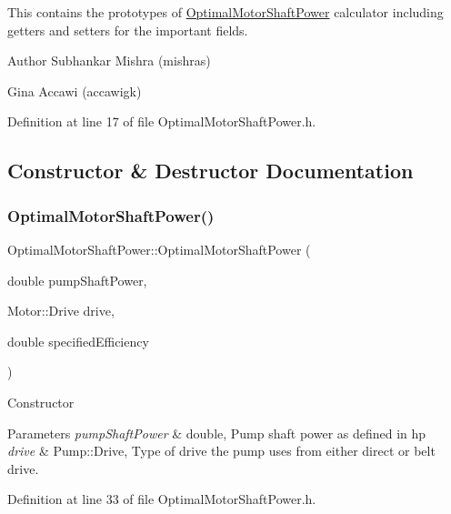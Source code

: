 This contains the prototypes of \hyperlink{class_optimal_motor_shaft_power}{Optimal\+Motor\+Shaft\+Power} calculator including getters and setters for the important fields.

\begin{DoxyAuthor}{Author}
Subhankar Mishra (mishras) 

Gina Accawi (accawigk) 
\end{DoxyAuthor}


Definition at line 17 of file Optimal\+Motor\+Shaft\+Power.\+h.



\subsection{Constructor \& Destructor Documentation}
\mbox{\label{class_optimal_motor_shaft_power_ad830e1f8a7931e3c6bec5f8828d57e83}} 
\subsubsection{\texorpdfstring{Optimal\+Motor\+Shaft\+Power()}{OptimalMotorShaftPower()}}
{\footnotesize\ttfamily Optimal\+Motor\+Shaft\+Power\+::\+Optimal\+Motor\+Shaft\+Power (\begin{DoxyParamCaption}\item[{double}]{pump\+Shaft\+Power,  }\item[{Motor\+::\+Drive}]{drive,  }\item[{double}]{specified\+Efficiency }\end{DoxyParamCaption})\hspace{0.3cm}{\ttfamily [inline]}}

Constructor 
\begin{DoxyParams}{Parameters}
{\em pump\+Shaft\+Power} & double, Pump shaft power as defined in hp \\
\hline
{\em drive} & Pump\+::\+Drive, Type of drive the pump uses from either direct or belt drive. \\
\hline
\end{DoxyParams}


Definition at line 33 of file Optimal\+Motor\+Shaft\+Power.\+h.



